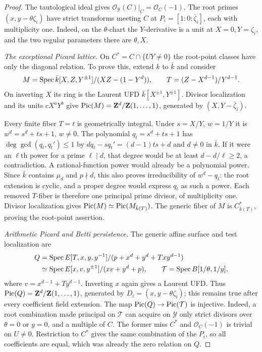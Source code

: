 \begin{proof}
The tautological ideal gives
$\mathcal O_{\mathcal Y}(C)|_C=\mathcal O_C(-1)$.
The root primes $(x,y-\theta\zeta_i)$ have strict transforms
meeting $C$ at $P_i=[1:0:\bar\zeta_i]$, each with multiplicity
one. Indeed, on the $\theta$-chart the $Y$-derivative is a unit
at $X=0,Y=\zeta_i$, and the two regular parameters there are
$\theta,X$.

\emph{The exceptional Picard lattice.}
On $C^*=C\cap\{UY\ne0\}$ the root-point classes have only
the diagonal relation. To prove this, extend $k$ to $\bar k$ and
consider
\[
 M=\operatorname{Spec}\bar k[X,Z,Y^{\pm1}]/(XZ-(1-Y^d)),\qquad
 T=(Z-X^{d-1})/Y^{d-1}.
\]
On inverting $X$ its ring is the Laurent UFD
$\bar k[X^{\pm1},Y^{\pm1}]$. Divisor localization and its units
$cX^aY^b$ give
$\operatorname{Pic}(M)=\mathbf Z^d/\mathbf Z(1,\ldots,1)$, generated by
$(X,Y-\bar\zeta_i)$.

Every finite fiber $T=t$ is geometrically integral. Under
$s=X/Y$, $w=1/Y$ it is
$w^d=s^d+ts+1$, $w\ne0$.
The polynomial $q_t=s^d+ts+1$ has $\deg\gcd(q_t,q_t')\le1$
by $dq_t-sq_t'=(d-1)ts+d$ and $d\ne0$ in $\bar k$.
If it were an $\ell$th power for a prime $\ell\mid d$,
that degree would be at least $d-d/\ell\ge2$, a contradiction.
A rational-function power would already be a polynomial power.
Since $\bar k$ contains $\mu_d$ and $p\nmid d$, this also
proves irreducibility of $w^d-q_t$: the root extension is
cyclic, and a proper degree would express $q_t$ as such a power.
Each removed $T$-fiber is therefore one principal prime divisor,
of multiplicity one. Divisor localization gives
$\operatorname{Pic}(M)\simeq\operatorname{Pic}(M_{\bar k(T)})$.
The generic fiber of $M$ is $C^*_{\bar k(T)}$, proving the root-point
assertion.

\emph{Arithmetic Picard and Betti persistence.}
The generic affine surface and test localization are
\begin{align*}
 Q&=\operatorname{Spec} E[T,x,y,y^{-1}]/(p+x^d+y^d+Txy^{d-1})\\
  &\simeq\operatorname{Spec} E[x,v,y^{\pm1}]/(xv+y^d+p),\qquad
 \mathcal T=\operatorname{Spec} B[1/\theta,1/y],
\end{align*}
where $v=x^{d-1}+Ty^{d-1}$. Inverting $x$ again gives a
Laurent UFD. Thus $\operatorname{Pic}(Q)=\mathbf Z^d/\mathbf Z(1,\ldots,1)$, generated
by $D_i=(x,y-\theta\zeta_i)$; this remains true after every
coefficient field extension.
The map $\operatorname{Pic}(Q)\to\operatorname{Pic}(\mathcal T)$ is injective.
Indeed, a root combination made principal on $\mathcal T$
can acquire on $\mathcal Y$ only strict divisors over $\theta=0$
or $y=0$, and a multiple of $C$. The former miss $C^*$ and
$\mathcal O_C(-1)$ is trivial on $U\ne0$.
Restriction to $C^*$ gives the same combination of the $P_i$,
so all coefficients are equal, which was already the zero
relation on $Q$.


\end{proof}
